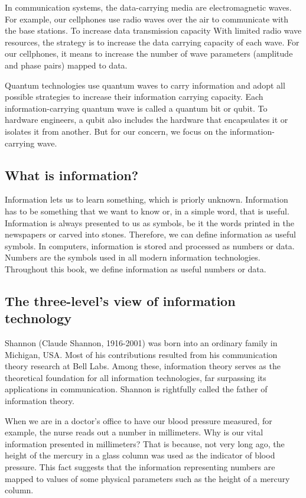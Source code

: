 \documentclass[oneside, letter, 12pt]{book}
\begin{document}
In communication systems, the data-carrying media are electromagnetic waves. For example, our cellphones use radio waves over the air to communicate with the base stations. To increase data transmission capacity With limited radio wave resources, the strategy is to increase the data carrying capacity of each wave. For our cellphones, it means to increase the number of wave parameters (amplitude and phase pairs) mapped to data.

Quantum technologies use quantum waves to carry information and adopt all possible strategies to increase their information carrying capacity. Each information-carrying quantum wave is called a quantum bit or qubit. To hardware engineers, a qubit also includes the hardware that encapsulates it or isolates it from another. But for our concern, we focus on the information-carrying wave.

\subsection{What is information?}
Information lets us to learn something, which is priorly unknown. Information has to be something that we want to know or, in a simple word, that is useful. Information is always presented to us as symbols, be it the words printed in the newspapers or carved into stones. Therefore, we can define information as useful symbols. In computers, information is stored and processed as numbers or data. Numbers are the symbols used in all modern information technologies. Throughout this book, we define information as useful numbers or data.

\subsection{The three-level's view of information technology}
Shannon (Claude Shannon, 1916-2001) was born into an ordinary family in Michigan, USA. Most of his contributions resulted from his communication theory research at Bell Labs. Among these, information theory serves as the theoretical foundation for all information technologies, far surpassing its applications in communication. Shannon is rightfully called the father of information theory.

When we are in a doctor's office to have our blood pressure measured, for example, the nurse reads out a number in millimeters. Why is our vital information presented in millimeters? That is because, not very long ago, the height of the mercury in a glass column was used as the indicator of blood pressure. This fact suggests that the information representing numbers are mapped to values of some physical parameters such as the height of a mercury column.
\end{document}
